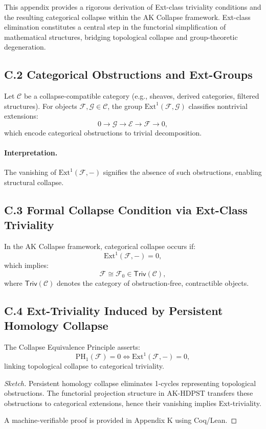 \documentclass[11pt]{article}
\begin{document}
This appendix provides a rigorous derivation of Ext-class triviality conditions and the resulting categorical collapse within the AK Collapse framework. Ext-class elimination constitutes a central step in the functorial simplification of mathematical structures, bridging topological collapse and group-theoretic degeneration.

\subsection*{C.2 Categorical Obstructions and Ext-Groups}

Let $\mathcal{C}$ be a collapse-compatible category (e.g., sheaves, derived categories, filtered structures). For objects $\mathcal{F}, \mathcal{G} \in \mathcal{C}$, the group $\mathrm{Ext}^1(\mathcal{F}, \mathcal{G})$ classifies nontrivial extensions:
\[
0 \longrightarrow \mathcal{G} \longrightarrow \mathcal{E} \longrightarrow \mathcal{F} \longrightarrow 0,
\]
which encode categorical obstructions to trivial decomposition.

\paragraph{Interpretation.}  
The vanishing of $\mathrm{Ext}^1(\mathcal{F}, -)$ signifies the absence of such obstructions, enabling structural collapse.

\subsection*{C.3 Formal Collapse Condition via Ext-Class Triviality}

In the AK Collapse framework, categorical collapse occurs if:
\[
\mathrm{Ext}^1(\mathcal{F}, -) = 0,
\]
which implies:
\[
\mathcal{F} \cong \mathcal{F}_0 \in \mathsf{Triv}(\mathcal{C}),
\]
where $\mathsf{Triv}(\mathcal{C})$ denotes the category of obstruction-free, contractible objects.

\subsection*{C.4 Ext-Triviality Induced by Persistent Homology Collapse}

The Collapse Equivalence Principle asserts:
\[
\mathrm{PH}_1(\mathcal{F}) = 0 \iff \mathrm{Ext}^1(\mathcal{F}, -) = 0,
\]
linking topological collapse to categorical triviality.

\begin{proof}[Sketch]
Persistent homology collapse eliminates 1-cycles representing topological obstructions. The functorial projection structure in AK-HDPST transfers these obstructions to categorical extensions, hence their vanishing implies Ext-triviality.

A machine-verifiable proof is provided in Appendix K using Coq/Lean.
\end{proof}
\end{document}
